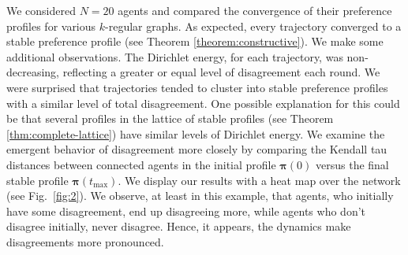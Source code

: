 \documentclass[conference]{ieeeconf}
\newcommand{\profile}{\boldsymbol{\pi}}
\begin{document}
We considered $N=20$ agents and compared the convergence of their preference profiles for various $k$-regular graphs.
As expected, every trajectory converged to a stable preference profile (see Theorem \ref{theorem:constructive}). We make some additional observations. The Dirichlet energy, for each trajectory, was non-decreasing, reflecting a greater or equal level of disagreement each round.
We were surprised that trajectories tended to cluster into stable preference profiles with a similar level of total disagreement. One possible explanation for this could be that several profiles in the lattice of stable profiles (see Theorem \ref{thm:complete-lattice}) have similar levels of Dirichlet energy. We examine the emergent behavior of disagreement more closely by comparing the Kendall tau distances between connected agents in the initial profile $\profile(0)$ versus the final stable profile $\profile(t_{\max})$. We display our results with a heat map over the network (see Fig.~\ref{fig:2}). We observe, at least in this example, that agents, who initially have some disagreement, end up disagreeing more, while agents who don't disagree initially, never disagree. Hence, it appears, the dynamics make disagreements more pronounced.
\end{document}
